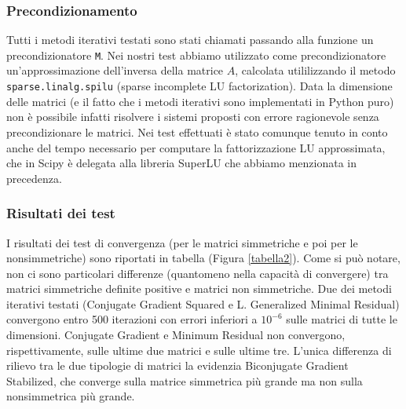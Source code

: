 \documentclass[11pt,a4paper]{scrartcl}
\begin{document}
\subsubsection*{Precondizionamento}

Tutti i metodi iterativi testati sono stati chiamati passando alla funzione un precondizionatore \texttt{M}. Nei nostri test abbiamo utilizzato come precondizionatore un'approssimazione dell'inversa della matrice $A$, calcolata utililizzando il metodo \texttt{sparse.linalg.spilu} (sparse incomplete LU factorization). 
Data la dimensione delle matrici (e il fatto che i metodi iterativi sono implementati in Python puro) non è possibile infatti risolvere i sistemi proposti con errore ragionevole senza precondizionare le matrici. Nei test effettuati è stato comunque tenuto in conto anche del tempo necessario per computare la fattorizzazione LU approssimata, che in Scipy è delegata alla libreria SuperLU che abbiamo menzionata in precedenza.

\subsubsection*{Risultati dei test}

I risultati dei test di convergenza (per le matrici simmetriche e poi per le nonsimmetriche) sono riportati in tabella (Figura \ref{tabella2}). Come si può notare, non ci sono particolari differenze (quantomeno nella capacità di convergere) tra matrici simmetriche definite positive e matrici non simmetriche. Due dei metodi iterativi testati (Conjugate Gradient Squared e L. Generalized Minimal Residual) convergono entro 500 iterazioni con errori inferiori a $10^{-6}$ sulle matrici di tutte le dimensioni. Conjugate Gradient e Minimum Residual non convergono, rispettivamente, sulle ultime due matrici e sulle ultime tre. L'unica differenza di rilievo tra le due tipologie di matrici la evidenzia Biconjugate Gradient Stabilized, che converge sulla matrice simmetrica più grande ma non sulla nonsimmetrica più grande.
\end{document}
